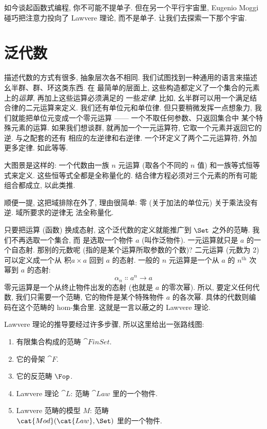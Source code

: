 
\lettrine[lhang=0.17]{如}{今谈起函数式编程}, 你不可能不提单子. 但在另一个平行宇宙里, Eugenio Moggi
碰巧把注意力投向了 Lawvere 理论, 而不是单子. 让我们去探索一下那个宇宙.

\section{泛代数}

描述代数的方式有很多, 抽象层次各不相同. 我们试图找到一种通用的语言来描述幺半群、群、环这类东西. 在
最简单的层面上, 这些构造都定义了一个集合的元素上的\emph{运算}, 再加上这些运算必须满足的
一些\emph{定律}. 比如, 幺半群可以用一个满足结合律的二元运算来定义. 我们还有单位元和单位律.
但只要稍微发挥一点想象力, 我们就能把单位元变成一个零元运算 —— 一个不取任何参数、只返回集合中
某个特殊元素的运算. 如果我们想谈群, 就再加一个一元运算符, 它取一个元素并返回它的逆. 与之配套的还有
相应的左逆律和右逆律. 一个环定义了两个二元运算符, 外加更多定律. 如此等等.

大图景是这样的: 一个代数由一族 $n$ 元运算 (取各个不同的 $n$ 值) 和一族等式恒等式来定义.
这些恒等式全都是全称量化的. 结合律方程必须对三个元素的所有可能组合都成立, 以此类推.

顺便一提, 这把域排除在外了, 理由很简单: 零 (关于加法的单位元) 关于乘法没有逆. 域所要求的逆律无
法全称量化.

只要把运算 (函数) 换成态射, 这个泛代数的定义就能推广到 $\Set$ 之外的范畴. 我们不再选取一个集合, 而
是选取一个物件 $a$ (叫作泛物件). 一元运算就只是 $a$ 的一个自态射. 那别的元数呢
(指的是某个运算所取参数的个数)? 二元运算 (元数为 2) 可以定义成一个从
积$a\times{}a$ 回到 $a$ 的态射. 一般的 $n$ 元运算是一个从 $a$ 的 $n^\text{th}$ 次幂到 $a$ 的态射:
\[\alpha_n \Colon a^n \to a\] 零元运算是一个从终止物件出发的态射 (也就是 $a$ 的零次幂). 所以,
要定义任何代数, 我们只需要一个范畴, 它的物件是某个特殊物件 $a$ 的各次幂. 具体的代数则编码在这个范畴的
hom-集合里. 这就是一言以蔽之的 Lawvere 理论.

Lawvere 理论的推导要经过许多步骤, 所以这里给出一张路线图:

\begin{enumerate}
  \tightlist
  \item
有限集合构成的范畴 $\cat{FinSet}$.
  \item
它的骨架 $\cat{F}$.
  \item
它的反范畴 $\Fop$.
  \item
Lawvere 理论 $\cat{L}$: 范畴 $\cat{Law}$ 里的一个物件.
  \item
Lawvere 范畴的模型 $M$: 范畴\\ $\cat{Mod}(\cat{Law}, \Set)$ 里的一个物件.
\end{enumerate}

